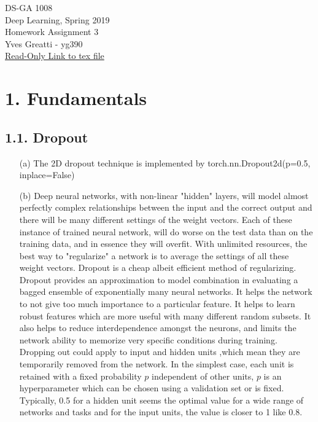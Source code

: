 \documentclass[11pt]{article}
\newcommand{\0}{\mat{0}}
\begin{document}
\noindent DS-GA 1008\\
Deep Learning, Spring 2019\\
Homework Assignment 3 \\
Yves Greatti - yg390\\
\href{https://www.overleaf.com/project/5c8521e162afe55c8eda31eb}{Read-Only Link to tex file}


\section*{1. Fundamentals}

\subsection*{1.1. Dropout}

\begin{itemize}
    \item[(a)]    The 2D dropout  technique is implemented by torch.nn.Dropout2d(p=0.5, inplace=False)
    \item[(b)]  
Deep neural networks, with non-linear "hidden" layers, will model almost perfectly complex relationships between the input and the correct output and there will be many different settings of the weight vectors. Each of these instance of trained neural network, will do worse on the test data than on the training data, and in essence they will overfit. With unlimited resources, the best way to "regularize" a network is to average the settings of all these weight vectors. Dropout is a cheap albeit efficient method of regularizing. Dropout provides an approximation to model combination  in evaluating a bagged ensemble of exponentially many neural networks.  It helps the network to not give too much importance to a particular feature. It helps to learn robust features which are more useful with many different random subsets. It also helps to reduce interdependence amongst the neurons, and limits the network ability to memorize very specific conditions during training.\\
Dropping out could apply to input and hidden units ,which mean they are temporarily removed from the network. In the simplest case, each unit is retained with a fixed probability $p$ independent of other units, $p$ is an hyperparameter which can be chosen using a validation set or is fixed. Typically, 0.5 for a hidden unit seems the optimal value for a wide range of networks and tasks and for the input units, the  value is closer to 1 like 0.8.\\

\end{itemize}
\end{document}
